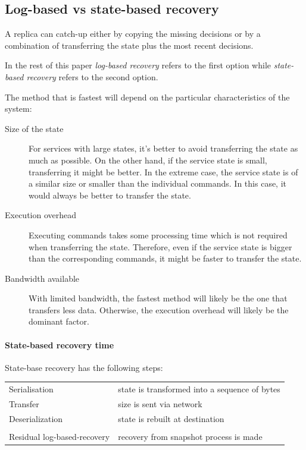 \subsection{Log-based vs state-based recovery}
\label{subsec:log_based_state_based_recovery}
A replica can catch-up either by copying the missing decisions or by a combination of transferring the state plus the most recent decisions.

In the rest of this paper \emph{log-based recovery} refers to the first option while \emph{state-based recovery} refers to the second option.

The method that is fastest will depend on the particular characteristics of the system:

\begin{description}
  \item[Size of the state] For services with large states, it's better to avoid transferring the state as much as possible. On the other hand, if the service state is small, transferring it might be better. In the extreme case, the service state is of a similar size or smaller than the individual commands. In this case, it would always be better to transfer the state.

  \item[Execution overhead] Executing commands takes some processing time which is not required when transferring the state. Therefore, even if the service state is bigger than the corresponding commands, it might be faster to transfer the state.

  \item[Bandwidth available] With limited bandwidth, the fastest  method will likely be the one that transfers less data. Otherwise, the execution overhead will likely be the dominant factor.
\end{description}

\paragraph{State-based recovery time}

State-base recovery has the following steps:

\begin{table}[H]
  \footnotesize
  \begin{center}
    \begin{tabular}{ll}
      Serialisation               & state is transformed into a sequence of bytes \\
      Transfer                    & size is sent via network \\
      Deserialization             & state is rebuilt at destination \\
      &\\
      Residual log-based-recovery & recovery from snapshot process is made \\
    \end{tabular}
  \end{center}
  \vspace{-1em}
\end{table}

